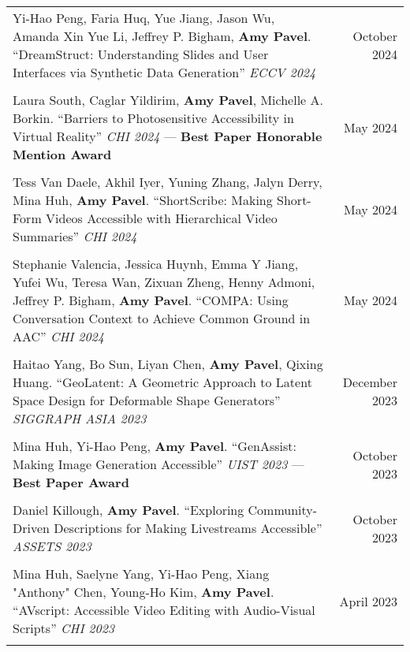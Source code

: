 \begin{longtable}{Xr}
	Yi-Hao Peng, Faria Huq, Yue Jiang, Jason Wu, Amanda Xin Yue Li, Jeffrey P. Bigham, \textbf{Amy Pavel}. ``DreamStruct: Understanding Slides and User Interfaces via Synthetic Data Generation'' \textit{ECCV 2024} & October 2024 \\
	\\

	Laura South, Caglar Yildirim, \textbf{Amy Pavel}, Michelle A. Borkin. ``Barriers to Photosensitive Accessibility in Virtual Reality'' \textit{CHI 2024} --- \textbf{Best Paper Honorable Mention Award} & May 2024 \\
	\\

	Tess Van Daele, Akhil Iyer, Yuning Zhang, Jalyn Derry, Mina Huh, \textbf{Amy Pavel}. ``ShortScribe: Making Short-Form Videos Accessible with Hierarchical Video Summaries'' \textit{CHI 2024} & May 2024 \\
	\\

	Stephanie Valencia, Jessica Huynh, Emma Y Jiang, Yufei Wu, Teresa Wan, Zixuan Zheng, Henny Admoni, Jeffrey P. Bigham, \textbf{Amy Pavel}. ``COMPA: Using Conversation Context to Achieve Common Ground in AAC'' \textit{CHI 2024} & May 2024 \\
	\\

	Haitao Yang, Bo Sun, Liyan Chen, \textbf{Amy Pavel}, Qixing Huang. ``GeoLatent: A Geometric Approach to Latent Space Design for Deformable Shape Generators'' \textit{SIGGRAPH ASIA 2023} & December 2023 \\
	\\

	Mina Huh, Yi-Hao Peng, \textbf{Amy Pavel}. ``GenAssist: Making Image Generation Accessible'' \textit{UIST 2023} --- \textbf{Best Paper Award} & October 2023 \\
	\\

	Daniel Killough, \textbf{Amy Pavel}. ``Exploring Community-Driven Descriptions for Making Livestreams Accessible'' \textit{ASSETS 2023} & October 2023 \\
	\\

	Mina Huh, Saelyne Yang, Yi-Hao Peng, Xiang "Anthony" Chen, Young-Ho Kim, \textbf{Amy Pavel}. ``AVscript: Accessible Video Editing with Audio-Visual Scripts'' \textit{CHI 2023} & April 2023 \\
	\\


\end{longtable}

